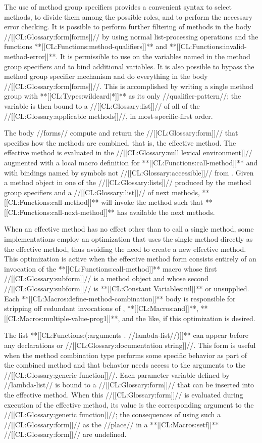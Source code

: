 The use of method group specifiers provides a convenient syntax to select methods, to divide them among the possible roles, and to perform the necessary error checking. It is possible to perform further filtering of methods in the body //[[CL:Glossary:form|forms]]// by using normal list-processing operations and the functions **[[CL:Functions:method-qualifiers]]** and **[[CL:Functions:invalid-method-error]]**. It is permissible to use  on the variables named in the method group specifiers and to bind additional variables. It is also possible to bypass the method group specifier mechanism and do everything in the body //[[CL:Glossary:form|forms]]//. This is accomplished by writing a single method group with **[[CL:Types:wildcard|*]]** as its only //qualifier-pattern//; the variable is then bound to a //[[CL:Glossary:list]]// of all of the //[[CL:Glossary:applicable methods]]//, in most-specific-first order.

The body //forms// compute and return the //[[CL:Glossary:form]]// that specifies how the methods are combined, that is, the effective method. The effective method is evaluated in the //[[CL:Glossary:null lexical environment]]// augmented with a local macro definition for **[[CL:Functions:call-method]]** and with bindings named by symbols not //[[CL:Glossary:accessible]]// from . Given a method object in one of the //[[CL:Glossary:lists]]// produced by the method group specifiers and a //[[CL:Glossary:list]]// of next methods, **[[CL:Functions:call-method]]** will invoke the method such that **[[CL:Functions:call-next-method]]** has available the next methods.

When an effective method has no effect other than to call a single method, some implementations employ an optimization that uses the single method directly as the effective method, thus avoiding the need to create a new effective method. This optimization is active when the effective method form consists entirely of an invocation of the **[[CL:Functions:call-method]]** macro whose first //[[CL:Glossary:subform]]// is a method object and whose second //[[CL:Glossary:subform]]// is **[[CL:Constant Variables:nil]]** or unsupplied. Each **[[CL:Macros:define-method-combination]]** body is responsible for stripping off redundant invocations of , **[[CL:Macros:and]]**, **[[CL:Macros:multiple-value-prog1]]**, and the like, if this optimization is desired.

The list **[[CL:Functions:(:arguments . //lambda-list//)]]** can appear before any declarations or //[[CL:Glossary:documentation string]]//. This form is useful when the method combination type performs some specific behavior as part of the combined method and that behavior needs access to the arguments to the //[[CL:Glossary:generic function]]//. Each parameter variable defined by //lambda-list// is bound to a //[[CL:Glossary:form]]// that can be inserted into the effective method. When this //[[CL:Glossary:form]]// is evaluated during execution of the effective method, its value is the corresponding argument to the //[[CL:Glossary:generic function]]//; the consequences of using such a //[[CL:Glossary:form]]// as the //place// in a **[[CL:Macros:setf]]** //[[CL:Glossary:form]]// are undefined.

